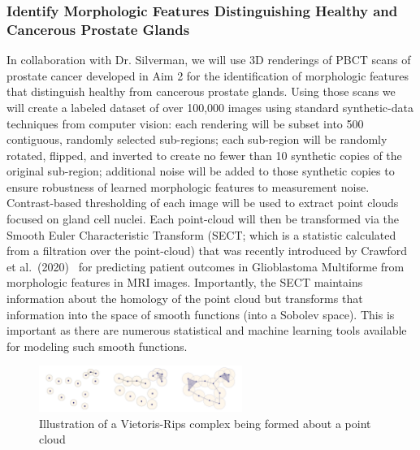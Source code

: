 \documentclass{NIHGrant}
\theoremstyle{theorem}
\begin{document}
\subsubsection*{Identify Morphologic Features Distinguishing Healthy and Cancerous Prostate Glands} \label{aim3.1}
In collaboration with Dr. Silverman, we will use 3D renderings of PBCT scans of prostate cancer developed in Aim 2 for the identification of morphologic features that distinguish healthy from cancerous prostate glands. Using those scans we will create a labeled dataset of over 100,000 images using standard synthetic-data techniques from computer vision: each rendering will be subset into 500 contiguous, randomly selected sub-regions; each sub-region will be randomly rotated, flipped, and inverted to create no fewer than 10 synthetic copies of the original sub-region; additional noise will be added to those synthetic copies to ensure robustness of learned morphologic features to measurement noise. Contrast-based thresholding of each image will be used to extract point clouds focused on gland cell nuclei. Each point-cloud will then be transformed via the Smooth Euler Characteristic Transform (SECT; which is a statistic calculated from a filtration over the point-cloud) that was recently introduced by Crawford et al.~(2020)~\cite{crawford_predicting_2020} for predicting patient outcomes in Glioblastoma Multiforme from morphologic features in MRI images. Importantly, the SECT maintains information about the homology of the point cloud but transforms that information into the space of smooth functions (into a Sobolev space). This is important as there are numerous statistical and machine learning tools available for modeling such smooth functions.

\begin{figure}
  \vspace{-.3cm} \includegraphics[width=0.59\textwidth]{ ./figures/vr.png }
  \caption{Illustration of a Vietoris-Rips complex being formed about a point cloud}\label{fig:setup}
\end{figure}
\end{document}
